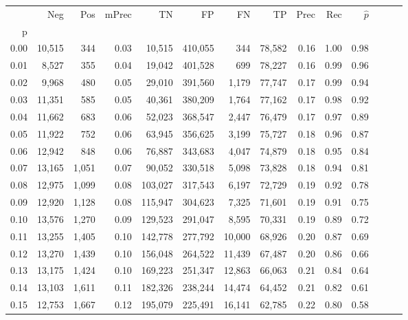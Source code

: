 \begin{tabular}{rrrrrrrrrrrrrr}
\toprule
{} &     Neg &    Pos & mPrec &       TN &       FP &      FN &      TP &  Prec &   Rec & $\hat{p}$ \\
p    &         &        &       &          &          &         &         &       &       &           \\
\midrule
0.00 &  10,515 &    344 &  0.03 &   10,515 &  410,055 &     344 &  78,582 &  0.16 &  1.00 &      0.98 \\
0.01 &   8,527 &    355 &  0.04 &   19,042 &  401,528 &     699 &  78,227 &  0.16 &  0.99 &      0.96 \\
0.02 &   9,968 &    480 &  0.05 &   29,010 &  391,560 &   1,179 &  77,747 &  0.17 &  0.99 &      0.94 \\
0.03 &  11,351 &    585 &  0.05 &   40,361 &  380,209 &   1,764 &  77,162 &  0.17 &  0.98 &      0.92 \\
0.04 &  11,662 &    683 &  0.06 &   52,023 &  368,547 &   2,447 &  76,479 &  0.17 &  0.97 &      0.89 \\
0.05 &  11,922 &    752 &  0.06 &   63,945 &  356,625 &   3,199 &  75,727 &  0.18 &  0.96 &      0.87 \\
0.06 &  12,942 &    848 &  0.06 &   76,887 &  343,683 &   4,047 &  74,879 &  0.18 &  0.95 &      0.84 \\
0.07 &  13,165 &  1,051 &  0.07 &   90,052 &  330,518 &   5,098 &  73,828 &  0.18 &  0.94 &      0.81 \\
0.08 &  12,975 &  1,099 &  0.08 &  103,027 &  317,543 &   6,197 &  72,729 &  0.19 &  0.92 &      0.78 \\
0.09 &  12,920 &  1,128 &  0.08 &  115,947 &  304,623 &   7,325 &  71,601 &  0.19 &  0.91 &      0.75 \\
0.10 &  13,576 &  1,270 &  0.09 &  129,523 &  291,047 &   8,595 &  70,331 &  0.19 &  0.89 &      0.72 \\
0.11 &  13,255 &  1,405 &  0.10 &  142,778 &  277,792 &  10,000 &  68,926 &  0.20 &  0.87 &      0.69 \\
0.12 &  13,270 &  1,439 &  0.10 &  156,048 &  264,522 &  11,439 &  67,487 &  0.20 &  0.86 &      0.66 \\
0.13 &  13,175 &  1,424 &  0.10 &  169,223 &  251,347 &  12,863 &  66,063 &  0.21 &  0.84 &      0.64 \\
0.14 &  13,103 &  1,611 &  0.11 &  182,326 &  238,244 &  14,474 &  64,452 &  0.21 &  0.82 &      0.61 \\
0.15 &  12,753 &  1,667 &  0.12 &  195,079 &  225,491 &  16,141 &  62,785 &  0.22 &  0.80 &      0.58 \\

\end{tabular}

